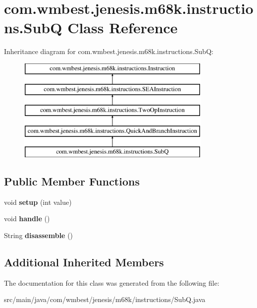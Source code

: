 \hypertarget{classcom_1_1wmbest_1_1jenesis_1_1m68k_1_1instructions_1_1SubQ}{\section{com.\-wmbest.\-jenesis.\-m68k.\-instructions.\-Sub\-Q Class Reference}
\label{classcom_1_1wmbest_1_1jenesis_1_1m68k_1_1instructions_1_1SubQ}
}
Inheritance diagram for com.\-wmbest.\-jenesis.\-m68k.\-instructions.\-Sub\-Q\-:\begin{figure}[H]
\begin{center}
\leavevmode
\includegraphics[height=5.000000cm]{classcom_1_1wmbest_1_1jenesis_1_1m68k_1_1instructions_1_1SubQ}
\end{center}
\end{figure}
\subsection*{Public Member Functions}
\begin{DoxyCompactItemize}
\item 
\hypertarget{classcom_1_1wmbest_1_1jenesis_1_1m68k_1_1instructions_1_1SubQ_ae7a84a277d0702df067c4bc311cbdc4b}{void {\bfseries setup} (int value)}\label{classcom_1_1wmbest_1_1jenesis_1_1m68k_1_1instructions_1_1SubQ_ae7a84a277d0702df067c4bc311cbdc4b}

\item 
\hypertarget{classcom_1_1wmbest_1_1jenesis_1_1m68k_1_1instructions_1_1SubQ_a558554b5d8c96f7ab60cfd87f45841bf}{void {\bfseries handle} ()}\label{classcom_1_1wmbest_1_1jenesis_1_1m68k_1_1instructions_1_1SubQ_a558554b5d8c96f7ab60cfd87f45841bf}

\item 
\hypertarget{classcom_1_1wmbest_1_1jenesis_1_1m68k_1_1instructions_1_1SubQ_af29368048c25265618e13bb58a62e23f}{String {\bfseries disassemble} ()}\label{classcom_1_1wmbest_1_1jenesis_1_1m68k_1_1instructions_1_1SubQ_af29368048c25265618e13bb58a62e23f}

\end{DoxyCompactItemize}
\subsection*{Additional Inherited Members}


The documentation for this class was generated from the following file\-:\begin{DoxyCompactItemize}
\item 
src/main/java/com/wmbest/jenesis/m68k/instructions/Sub\-Q.\-java\end{DoxyCompactItemize}
